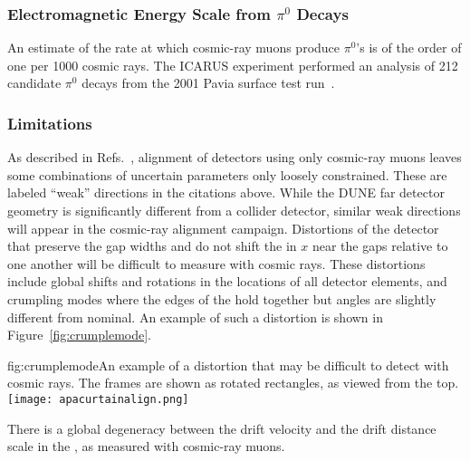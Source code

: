 \subsubsection{Electromagnetic Energy Scale from $\pi^0$ Decays}

An estimate of the rate at which cosmic-ray muons produce $\pi^0$'s is of the order of one per \num{1000}
cosmic rays.  The ICARUS experiment performed an analysis of \num{212} candidate $\pi^0$ decays
from the 2001 Pavia surface test run~\cite{Ankowski:2008aa}. 


\subsubsection{Limitations}

As described in Refs.~\cite{LacuestaMiquel:2015ksh,Moles-Valls:2014wza}, alignment of detectors using
only cosmic-ray muons leaves some combinations of uncertain parameters only loosely constrained.
These are labeled ``weak'' directions in the citations above.  While the DUNE far detector geometry is
significantly different from a collider detector, similar weak directions will appear in the cosmic-ray
alignment campaign.  Distortions of the detector that preserve the gap widths and do not shift
the  in $x$ near the gaps relative to one another will be difficult to measure with cosmic rays.
These distortions include global shifts and rotations in the locations of all detector elements,
and crumpling modes where the edges of the  hold together but angles are slightly different
from nominal.  An example of such a distortion is shown in Figure~\ref{fig:crumplemode}. 

\begin{dunefigure}{fig:crumplemode}{An example of a distortion that may be difficult to detect with cosmic rays.  The  frames are shown as
rotated rectangles, as viewed from the top.}
\texttt{[image: apacurtainalign.png]}
\end{dunefigure}

There is a global degeneracy between the drift velocity and the drift distance scale in the ,
as measured with cosmic-ray muons.

